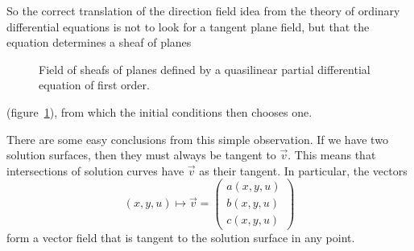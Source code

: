 So the correct translation of the direction field idea from the 
theory of ordinary differential equations is not to look for a tangent
plane field, but that the equation determines a sheaf of planes
\begin{figure}
\centering
{}
\caption{Field of sheafs of planes defined by a quasilinear partial
differential equation of first order.
\label{geometrie:ebenenbueschelfeld}}
\end{figure}
(figure~\ref{geometrie:ebenenbueschelfeld}), from which the initial
conditions then chooses one.

There are some easy conclusions from this simple observation.
If we have two solution surfaces, then they must always be tangent
to $\vec{v}$.
This means that intersections of solution curves have $\vec{v}$ as their
tangent.
In particular, the vectors
\[
(x,y,u)\mapsto
\vec v=
\begin{pmatrix}
a(x,y,u)\\b(x,y,u)\\c(x,y,u)
\end{pmatrix}
\]
form a vector field that is tangent to the solution surface in any point.


